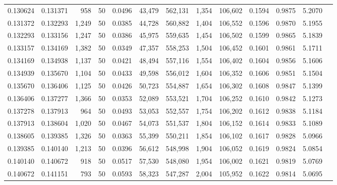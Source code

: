 \begin{tabular}{rrrrrrrrrrrrr}
0.130624 & 0.131371 &   958 &  50 &                                     0.0496 &  43,479 & 562,131 &   1,354 & 106,602 & 0.1594 & 0.9875 & 5.2070 \\
0.131372 & 0.132293 & 1,249 &  50 &                                     0.0385 &  44,728 & 560,882 &   1,404 & 106,552 & 0.1596 & 0.9870 & 5.1955 \\
0.132293 & 0.133156 & 1,247 &  50 &                                     0.0386 &  45,975 & 559,635 &   1,454 & 106,502 & 0.1599 & 0.9865 & 5.1839 \\
0.133157 & 0.134169 & 1,382 &  50 &                                     0.0349 &  47,357 & 558,253 &   1,504 & 106,452 & 0.1601 & 0.9861 & 5.1711 \\
0.134169 & 0.134938 & 1,137 &  50 &                                     0.0421 &  48,494 & 557,116 &   1,554 & 106,402 & 0.1604 & 0.9856 & 5.1606 \\
0.134939 & 0.135670 & 1,104 &  50 &                                     0.0433 &  49,598 & 556,012 &   1,604 & 106,352 & 0.1606 & 0.9851 & 5.1504 \\
0.135670 & 0.136406 & 1,125 &  50 &                                     0.0426 &  50,723 & 554,887 &   1,654 & 106,302 & 0.1608 & 0.9847 & 5.1399 \\
0.136406 & 0.137277 & 1,366 &  50 &                                     0.0353 &  52,089 & 553,521 &   1,704 & 106,252 & 0.1610 & 0.9842 & 5.1273 \\
0.137278 & 0.137913 &   964 &  50 &                                     0.0493 &  53,053 & 552,557 &   1,754 & 106,202 & 0.1612 & 0.9838 & 5.1184 \\
0.137913 & 0.138604 & 1,020 &  50 &                                     0.0467 &  54,073 & 551,537 &   1,804 & 106,152 & 0.1614 & 0.9833 & 5.1089 \\
0.138605 & 0.139385 & 1,326 &  50 &                                     0.0363 &  55,399 & 550,211 &   1,854 & 106,102 & 0.1617 & 0.9828 & 5.0966 \\
0.139385 & 0.140140 & 1,213 &  50 &                                     0.0396 &  56,612 & 548,998 &   1,904 & 106,052 & 0.1619 & 0.9824 & 5.0854 \\
0.140140 & 0.140672 &   918 &  50 &                                     0.0517 &  57,530 & 548,080 &   1,954 & 106,002 & 0.1621 & 0.9819 & 5.0769 \\
0.140672 & 0.141151 &   793 &  50 &                                     0.0593 &  58,323 & 547,287 &   2,004 & 105,952 & 0.1622 & 0.9814 & 5.0695 \\

\end{tabular}
